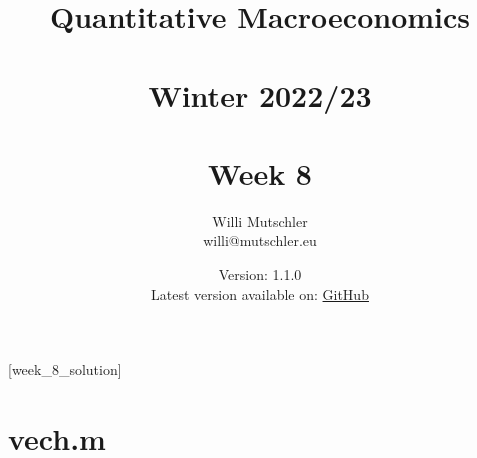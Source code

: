 
\newif\ifDisplaySolutions%


\title{Quantitative Macroeconomics\\~\\Winter 2022/23\\~\\Week 8}
\author{Willi Mutschler\\willi@mutschler.eu}
\date{Version: 1.1.0\\Latest version available on: \href{https://github.com/wmutschl/Quantitative-Macroeconomics/releases/latest/download/week_8.pdf}{GitHub}}
\maketitle\thispagestyle{empty}

\newpage
{}[week_8_solution]
\tableofcontents\thispagestyle{empty}\newpage

\setcounter{page}{1}
\newpage
\newpage
\newpage
\newpage

\printbibliography
\appendix
\section{vech.m}



\ifDisplaySolutions
\newpage
\appendix
\section{Solutions}

\fi
